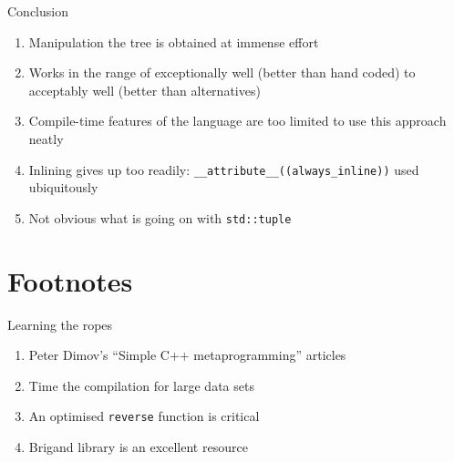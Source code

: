 \documentclass[xcolor=dvipsnames]{beamer}
\begin{document}
\begin{frame}[fragile]{Conclusion}
  \begin{enumerate}
  \item Manipulation the tree is obtained at immense effort \vspace{5mm}
  \item Works in the range of exceptionally well (better than hand coded) to acceptably well (better than alternatives) \vspace{5mm}
  \item Compile-time features of the language are too limited to use this approach neatly \vspace{5mm}
  \item Inlining gives up too readily: \verb$__attribute__((always_inline))$ used ubiquitously \vspace{5mm}
  \item Not obvious what is going on with \verb$std::tuple$ \vspace{5mm}
  \end{enumerate}
\end{frame}


\section{Footnotes}


\begin{frame}[fragile]{Learning the ropes}
  \begin{enumerate}
  \item Peter Dimov's ``Simple C++ metaprogramming'' articles \vspace{5mm}
  \item Time the compilation for large data sets \vspace{5mm}
  \item An optimised \texttt{reverse} function is critical \vspace{5mm}
  \item Brigand library is an excellent resource \vspace{5mm}
  \end{enumerate}
\end{frame}
\end{document}
